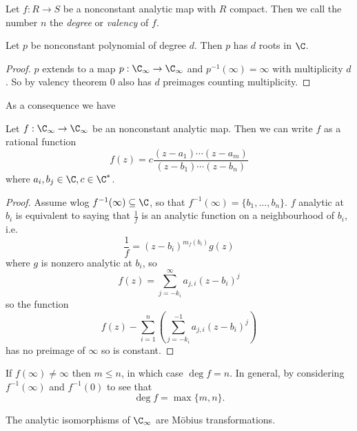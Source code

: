 \documentclass[a4paper]{article}
\begin{document}
\begin{definition}
  Let \(f: R \to S\) be a nonconstant analytic map with \(R\) compact. Then we call the number \(n\) the \emph{degree} or \emph{valency} of \(f\).
\end{definition}

\begin{corollary}
  Let \(p\) be nonconstant polynomial of degree \(d\). Then \(p\) has \(d\) roots in \(\C\).
\end{corollary}

\begin{proof}
  \(p\) extends to a map \(p: \C_\infty \to \C_\infty\) and \(p^{-1}(\infty) = \infty\) with multiplicity \(d\). So by valency theorem \(0\) also has \(d\) preimages counting multiplicity.
\end{proof}

As a consequence we have

\begin{proposition}
  Let \(f: \C_\infty \to \C_\infty\) be an nonconstant analytic map. Then we can write \(f\) as a rational function
  \[
    f(z) = c \frac{(z - a_1) \cdots (z - a_m)}{(z - b_1) \cdots (z - b_n)}
  \]
  where \(a_i, b_j \in \C, c \in \C^*\).
\end{proposition}

\begin{proof}
  Assume wlog \(f^{-1}(\infty) \subseteq \C\), so that \(f^{-1}(\infty) = \{b_1, \dots, b_n\}\). \(f\) analytic at \(b_i\) is equivalent to saying that \(\frac{1}{f}\) is an analytic function on a neighbourhood of \(b_i\), i.e.
  \[
    \frac{1}{f} = (z - b_i)^{m_f(b_i)} g(z)
  \]
  where \(g\) is nonzero analytic at \(b_i\), so
  \[
    f(z) = \sum_{j = -k_i}^\infty a_{j, i} (z - b_i)^j
  \]
  so the function
  \[
    f(z) - \sum_{i = 1}^n \left(\sum_{j = -k_i}^{-1} a_{j, i} (z - b_i)^j \right)
  \]
  has no preimage of \(\infty\) so is constant.
\end{proof}

\begin{remark}
  If \(f(\infty) \neq \infty\) then \(m \leq n\), in which case \(\deg f = n\). In general, by considering \(f^{-1}(\infty)\) and \(f^{-1}(0)\) to see that
  \[
    \deg f = \max \{m, n\}.
  \]
\end{remark}

\begin{corollary}
  The analytic isomorphisms of \(\C_\infty\) are Möbius transformations.
\end{corollary}
\end{document}
